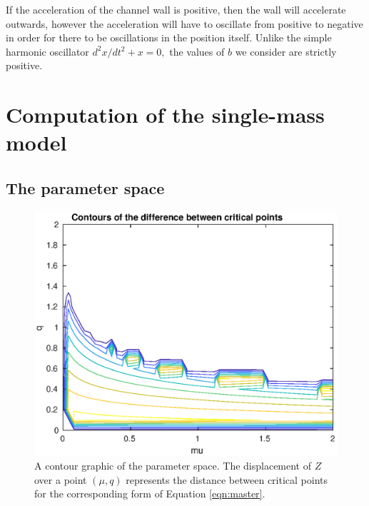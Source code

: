\documentclass{article}
\begin{document}
If the acceleration of the channel wall is positive, then the wall will accelerate outwards,
however the acceleration will have to oscillate from positive to negative in order for there to be oscillations in the position itself.
Unlike the simple harmonic oscillator $d^2 x/dt^2 + x = 0,$ the values of $b$ we consider are strictly positive.

\section{Computation of the single-mass model}



\subsection{The parameter space}

\begin{figure}
	\centering
	\includegraphics[width=\linewidth]{param_space}
	\caption{A contour graphic of the parameter space. The displacement of $Z$ over a point $(\mu,q)$ represents the distance between critical points for the corresponding form of Equation \ref{eqn:master}.}
	\label{fig:param_space}
\end{figure}
\end{document}
